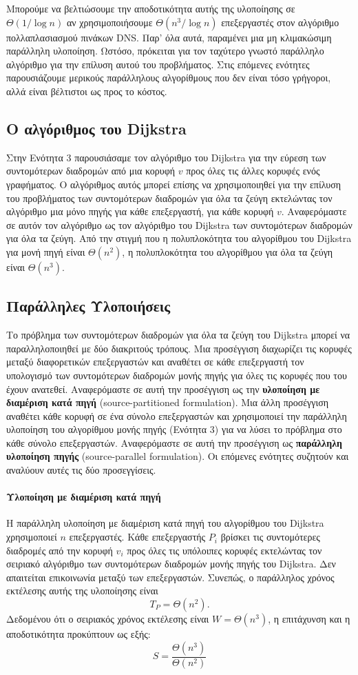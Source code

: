 \documentclass[12pt,a4paper]{article} %
\begin{document}
{Μπορούμε να βελτιώσουμε την αποδοτικότητα αυτής της υλοποίησης σε $\Theta(1/\log n)$ αν χρησιμοποιήσουμε $\Theta(n^{3}/\log n)$ επεξεργαστές στον αλγόριθμο πολλαπλασιασμού πινάκων DNS. Παρ' όλα αυτά, παραμένει μια μη κλιμακώσιμη παράλληλη υλοποίηση. Ωστόσο, πρόκειται για τον ταχύτερο γνωστό παράλληλο αλγόριθμο για την επίλυση αυτού του προβλήματος. Στις επόμενες ενότητες παρουσιάζουμε μερικούς παράλληλους αλγορίθμους που δεν είναι τόσο γρήγοροι, αλλά είναι βέλτιστοι ως προς το κόστος.

\subsection{Ο αλγόριθμος του Dijkstra}
Στην Ενότητα 3 παρουσιάσαμε τον αλγόριθμο του Dijkstra για την εύρεση των συντομότερων διαδρομών από μια κορυφή $v$ προς όλες τις άλλες κορυφές ενός γραφήματος. Ο αλγόριθμος αυτός μπορεί επίσης να χρησιμοποιηθεί για την επίλυση του προβλήματος των συντομότερων διαδρομών για όλα τα ζεύγη εκτελώντας τον αλγόριθμο μια μόνο πηγής για κάθε επεξεργαστή, για κάθε κορυφή $v$. Αναφερόμαστε σε αυτόν τον αλγόριθμο ως τον αλγόριθμο του Dijkstra των συντομότερων διαδρομών για όλα τα ζεύγη. Από την στιγμή που η πολυπλοκότητα του αλγορίθμου του Dijkstra για μονή πηγή είναι $\Theta(n^2)$, η πολυπλοκότητα του αλγορίθμου για όλα τα ζεύγη είναι $\Theta(n^3)$.

\subsection*{Παράλληλες Υλοποιήσεις}
Το πρόβλημα των συντομότερων διαδρομών για όλα τα ζεύγη του Dijkstra μπορεί να παραλληλοποιηθεί με δύο διακριτούς τρόπους. Μια προσέγγιση διαχωρίζει τις κορυφές μεταξύ διαφορετικών επεξεργαστών και αναθέτει σε κάθε επεξεργαστή τον υπολογισμό των συντομότερων διαδρομών μονής πηγής για όλες τις κορυφές που του έχουν ανατεθεί. Αναφερόμαστε σε αυτή την προσέγγιση ως την \textbf{υλοποίηση με διαμέριση κατά πηγή} (source-partitioned formulation). Μια άλλη προσέγγιση αναθέτει κάθε κορυφή σε ένα σύνολο επεξεργαστών και χρησιμοποιεί την παράλληλη υλοποίηση του αλγορίθμου μονής πηγής (Ενότητα 3) για να λύσει το πρόβλημα στο κάθε σύνολο επεξεργαστών. Αναφερόμαστε σε αυτή την προσέγγιση ως \textbf{παράλληλη υλοποίηση πηγής} (source-parallel formulation). Οι επόμενες ενότητες συζητούν και αναλύουν αυτές τις δύο προσεγγίσεις.

\paragraph{Υλοποίηση με διαμέριση κατά πηγή}
Η παράλληλη υλοποίηση με διαμέριση κατά πηγή του αλγορίθμου του Dijkstra χρησιμοποιεί $n$ επεξεργαστές. Κάθε επεξεργαστής $P_i$ βρίσκει τις συντομότερες διαδρομές από την κορυφή $v_i$ προς όλες τις υπόλοιπες κορυφές εκτελώντας τον σειριακό αλγόριθμο των συντομότερων διαδρομών μονής πηγής του Dijkstra. Δεν απαιτείται επικοινωνία μεταξύ των επεξεργαστών. Συνεπώς, ο παράλληλος χρόνος εκτέλεσης αυτής της υλοποίησης είναι
\[
T_P = \Theta(n^{2}).
\]
Δεδομένου ότι ο σειριακός χρόνος εκτέλεσης είναι $W = \Theta(n^{3})$, η επιτάχυνση και η αποδοτικότητα προκύπτουν ως εξής:
\[
S = \frac{\Theta(n^{3})}{\Theta(n^{2})}
\]

}
\end{document}
